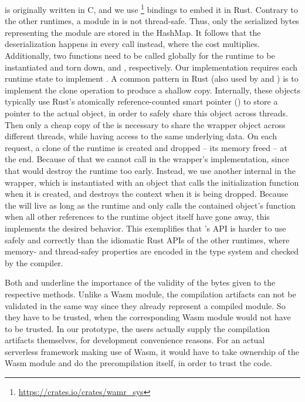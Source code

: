 \begin{description}[style=multiline, leftmargin=2.5cm, font=\bfseries]
    \item[Wamr]  is originally written in C, and we use \footnote{\url{https://crates.io/crates/wamr\_sys}} bindings to embed it in Rust. Contrary to the other runtimes, a module in  is not thread-safe. Thus, only the serialized bytes representing the module are stored in the HashMap. It follows that the deserialization happens in every  call instead, where the cost multiplies.
    Additionally, two functions need to be called globally for the runtime to be instantiated and torn down,  and , respectively.
    Our implementation requires each runtime state to implement . A common pattern in Rust (also used by  and ) is to implement the clone operation to produce a shallow copy. Internally, these objects typically use Rust's atomically reference-counted smart pointer () to store a pointer to the actual object, in order to safely share this object across threads. Then only a cheap copy of the  is necessary to share the wrapper object across different threads, while having access to the same underlying data. On each request, a clone of the runtime is created and dropped -- its memory freed -- at the end. Because of that we cannot call  in the wrapper's  implementation, since that would destroy the runtime too early. Instead, we use another internal  in the wrapper, which is instantiated with an object that calls the initialization function when it is created, and destroys the context when it is being dropped. Because the  will live as long as the runtime and only calls the contained object's  function when all other references to the runtime object itself have gone away, this implements the desired behavior.
    This exemplifies that 's API is harder to use safely and correctly than the idiomatic Rust APIs of the other runtimes, where memory- and thread-safey properties are encoded in the type system and checked by the compiler.

\end{description}

Both  and  underline the importance of the validity of the bytes given to the respective  methods. Unlike a Wasm module, the compilation artifacts can not be validated in the same way since they already represent a compiled module. So they have to be trusted, when the corresponding Wasm module would not have to be trusted. In our prototype, the users actually supply the compilation artifacts themselves, for development convenience reasons. For an actual serverless framework making use of Wasm, it would have to take ownership of the Wasm module and do the precompilation itself, in order to trust the code.

